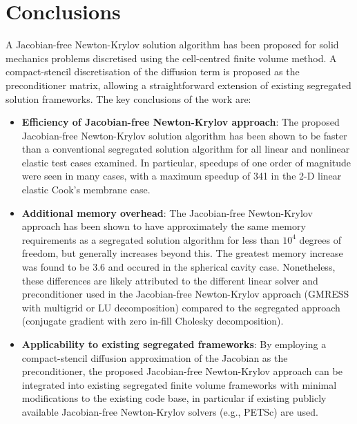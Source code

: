\documentclass[sn-mathphys,Numbered]{sn-jnl}%
\begin{document}
\section{Conclusions} \label{sec:conclusion}
A Jacobian-free Newton-Krylov solution algorithm has been proposed for solid mechanics problems discretised using the cell-centred finite volume method.
A compact-stencil discretisation of the diffusion term is proposed as the preconditioner matrix, allowing a straightforward extension of existing segregated solution frameworks.
The key conclusions of the work are:
\begin{itemize}
	\item \textbf{Efficiency of Jacobian-free Newton-Krylov approach}: The proposed Jacobian-free Newton-Krylov solution algorithm has been shown to be faster than a conventional segregated solution algorithm for all linear and nonlinear elastic test cases examined. In particular, speedups of one order of magnitude were seen in many cases, with a maximum speedup of 341 in the 2-D linear elastic Cook's membrane case.

	\item \textbf{Additional memory overhead}: The Jacobian-free Newton-Krylov approach has been shown to have approximately the same memory requirements as a segregated solution algorithm for less than $10^4$ degrees of freedom, but generally increases beyond this.
	The greatest memory increase was found to be 3.6 and occured in the spherical cavity case. Nonetheless, these differences are likely attributed to the different linear solver and preconditioner used in the Jacobian-free Newton-Krylov approach (GMRESS with multigrid or LU decomposition) compared to the segregated approach (conjugate gradient with zero in-fill Cholesky decomposition).
	
	\item \textbf{Applicability to existing segregated frameworks}: By employing a compact-stencil diffusion approximation of the Jacobian as the preconditioner, the proposed Jacobian-free Newton-Krylov approach can be integrated into existing segregated finite volume frameworks with minimal modifications to the existing code base, in particular if existing publicly available Jacobian-free Newton-Krylov solvers (e.g., PETSc) are used.



\end{itemize}
\end{document}
